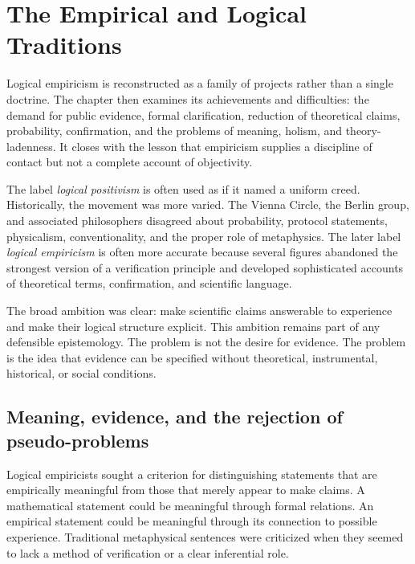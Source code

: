 \chapter{The Empirical and Logical Traditions}
\label{ch:empiricism}

\begin{chapterguide}
Logical empiricism is reconstructed as a family of projects rather than a
single doctrine. The chapter then examines its achievements and difficulties:
the demand for public evidence, formal clarification, reduction of theoretical
claims, probability, confirmation, and the problems of meaning, holism, and
theory-ladenness. It closes with the lesson that empiricism supplies a
discipline of contact but not a complete account of objectivity.
\end{chapterguide}

The label \emph{logical positivism} is often used as
if it named a uniform creed. Historically, the movement was more varied. The
Vienna Circle, the Berlin group, and associated philosophers disagreed about
probability, protocol statements, physicalism, conventionality, and the proper
role of metaphysics. The later label \emph{logical empiricism} is often more
accurate because several figures abandoned the strongest version of a
verification principle and developed sophisticated accounts of theoretical
terms, confirmation, and scientific language.

The broad ambition was clear: make scientific claims answerable to experience
and make their logical structure explicit. This ambition remains part of any
defensible epistemology. The problem is not the desire for evidence. The
problem is the idea that evidence can be specified without theoretical,
instrumental, historical, or social conditions.

\section{Meaning, evidence, and the rejection of pseudo-problems}

Logical empiricists sought a criterion for distinguishing statements that are
empirically meaningful from those that merely appear to make claims. A
mathematical statement could be meaningful through formal relations. An
empirical statement could be meaningful through its connection to possible
experience. Traditional metaphysical sentences were criticized when they
seemed to lack a method of verification or a clear inferential role.

